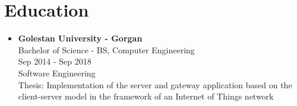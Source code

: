 \section*{\LARGE{Education}}
\begin{itemize}
    \item \large{\textbf{Golestan University - Gorgan}\\}\normalsize{
        Bachelor of Science - BS, Computer Engineering\\
        Sep 2014 - Sep 2018\\
        Software Engineering\\
        Thesis: Implementation of the server and gateway application based on the client-server model in the framework of an Internet of Things network}
\end{itemize}